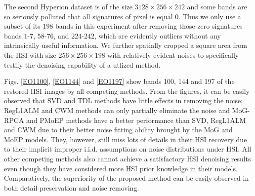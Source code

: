 \documentclass[journal]{IEEEtran}
\begin{document}


The second Hyperion dataset is of the size $ 3128 \times 256 \times 242 $ and some bands are so seriously polluted that all signatures of pixel is equal 0. Thus we only use a subset of its $198$ bands in this experiment after removing those zero signatures bands $ 1 $-$7$, $58$-$76$, and $224$-$242$, which are evidently outliers without any intrinsically useful information. We further spatially cropped a square area from the HSI with size $ 256 \times 256 \times 198 $ with relatively evident noises to specifically testify the denoising capability of a utlized method.

Figs. \ref{EO1100}, \ref{EO1144} and \ref{EO1197} show bands 100, 144 and 197 of the restored HSI images by all competing methods. From the figures, it can be easily observed that SVD and TDL methods have little effects in removing the noise; RegL1ALM and CWM methods can only partially eliminate the noise and MoG-RPCA and PMoEP methods have a better performance than SVD, RegL1ALM and CWM due to their better noise fitting ability brought by the MoG and MoEP models. They, however, still miss lots of details in their HSI recovery due to their implicit improper i.i.d. assumptions on noise distributions under HSI. All other competing methods also cannot achieve a satisfactory HSI denoising results even though they have considered more HSI prior knowledge in their models. Comparatively, the superiority of the proposed method can be easily observed in both detail preservation and noise removing.
\end{document}
